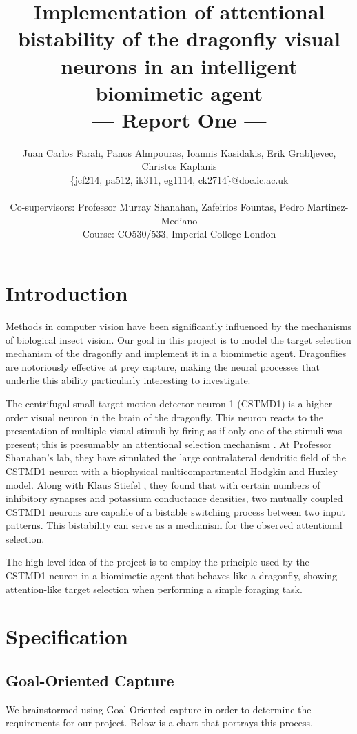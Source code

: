\documentclass[a4paper,11pt]{article}
\title{Implementation of attentional bistability of the dragonfly visual neurons in an intelligent biomimetic agent\\\Large{--- Report One ---}}
\author{Juan Carlos Farah, Panos Almpouras, Ioannis Kasidakis, Erik Grabljevec, Christos Kaplanis\\
       \{jcf214, pa512, ik311, eg1114, ck2714\}@doc.ic.ac.uk\\ \\
       \small{Co-supervisors: Professor Murray Shanahan, Zafeirios Fountas, Pedro Martinez-Mediano}\\
       \small{Course: CO530/533, Imperial College London}
}
\begin{document}
\maketitle

\section{Introduction}

Methods in computer vision have been significantly influenced by the mechanisms of biological insect vision. Our goal in this project is to model the target selection mechanism of the dragonfly and implement it in a biomimetic agent. Dragonflies are notoriously effective at prey capture, making the neural processes that underlie this ability particularly interesting to investigate. 

The centrifugal small ­target motion detector neuron 1 (CSTMD1) is a higher ­order visual neuron in the brain of the dragonfly. This neuron reacts to the presentation of multiple visual stimuli by firing as if only one of the stimuli was present; this is presumably an attentional selection mechanism \cite{w13}. At Professor Shanahan's lab, they have simulated the large contralateral dendritic field of the CSTMD1 neuron with a biophysical multi­compartmental Hodgkin and Huxley model. Along with Klaus Stiefel \cite{ne13}, they found that with certain numbers of inhibitory synapses and potassium conductance densities, two mutually coupled CSTMD1 neurons are capable of a bistable switching process between two input patterns. This bistability can serve as a mechanism for the observed attentional selection.

The high­ level idea of the project is to employ the principle used by the CSTMD1 neuron in a biomimetic agent that behaves like a dragonfly, showing attention-­like target selection when performing a simple foraging task.



\section{Specification}
	\subsection{Goal-Oriented Capture}
	We brainstormed using Goal-Oriented capture in order to determine the requirements for our project. Below is a chart that portrays this process.	
		
\end{document}
